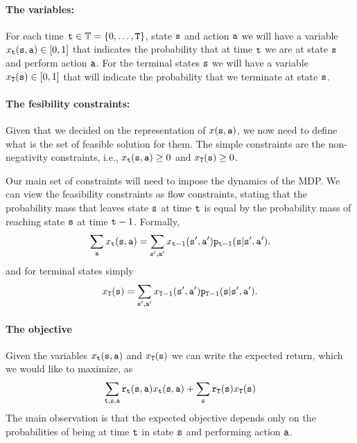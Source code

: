 \paragraph{The variables:}
For each time ${\tt t}\in\mathbb{T}=\{0,\ldots, {\tt T}\}$, state ${\tt s}$ and action
${\tt a}$ we will have a variable
$x_{{\tt t}}({\tt s},{\tt a})\in[0,1]$ that indicates the
probability that at time ${\tt t}$ we are at state ${\tt s}$ and
perform action ${\tt a}$. For the terminal states ${\tt s}$ we will
have a variable $x_{{\tt T}}({\tt s})\in[0,1]$ that will indicate the probability that we terminate at state ${\tt s}$.

\paragraph{The fesibility constraints:}
Given that we decided on the representation of $x({\tt s},{\tt a})$, we now need to define what is the set of feasible solution for them.
%
The simple constraints are the non-negativity constraints, i.e., $x_{\tt t}({\tt s},{\tt a})\geq 0$ and $x_{\tt T}({\tt s})\geq 0$.


Our main set of constraints will need to impose the dynamics of the MDP.
We can view the feasibility constraints as flow constraints, stating that the
probability mass that leaves state ${\tt s}$ at time ${\tt t}$ is
equal by the probability mass of reaching state ${\tt s}$ at time
${\tt t}-1$.
%
Formally,
\[
\sum_{{\tt a}} x_{{\tt t}}({\tt s},{\tt a})=
\sum_{{\tt s}',{\tt a}'}
x_{{\tt t}-1}({\tt s}',{\tt a}'){\tt p}_{{\tt t}-1}({\tt s}|{\tt s}',{\tt a}').
\]
and for terminal states simply
\[
x_{{\tt T}}({\tt s})=\sum_{{\tt s}',{\tt a}'}
x_{{\tt T}-1}({\tt s}',{\tt a}'){\tt p}_{{\tt T}-1}({\tt s}|{\tt s}',{\tt a}').
\]




\paragraph{The objective}
Given the variables  $x_{\tt t}({\tt s},{\tt a})$ and $x_{\tt T}({\tt s})$ we can write the expected return, which we would like to maximize, as
\[
\sum_{{\tt t},{\tt s},{\tt a}}
{\tt r}_{{\tt t}}({\tt s},{\tt a})x_{{\tt t}}({\tt s},{\tt a})+\sum_{{\tt s}}{\tt r}_{{\tt T}}({\tt s})x_{{\tt T}}({\tt s})
\]
The main observation is that the expected objective depends only on the probabilities of being at time ${\tt t}$ in state ${\tt s}$ and performing action ${\tt a}$.



